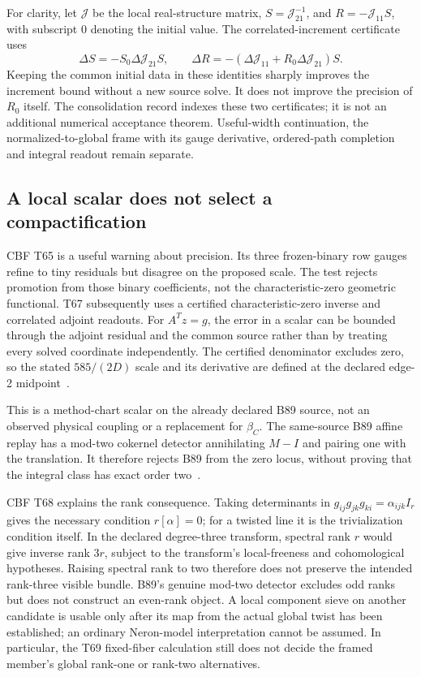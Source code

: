 \documentclass[11pt]{article}
\theoremstyle{definition}
\theoremstyle{remark}
\begin{document}
For clarity, let \(\mathcal J\) be the local real-structure matrix,
\(S=\mathcal J_{21}^{-1}\), and
\(R=-\mathcal J_{11}S\), with subscript 0 denoting the initial value.
The correlated-increment certificate uses
\[
 \Delta S=-S_0\Delta\mathcal J_{21}S,\qquad
 \Delta R=-(\Delta\mathcal J_{11}+R_0\Delta\mathcal J_{21})S.
\]
Keeping the common initial data in these identities sharply improves the
increment bound without a new source solve. It does not improve the
precision of \(R_0\) itself. The consolidation record indexes these two
certificates; it is not an additional numerical acceptance theorem.
Useful-width continuation, the normalized-to-global frame with its gauge
derivative, ordered-path completion and integral readout remain separate.

\subsection{A local scalar does not select a compactification}
\label{sec:readout-import}

CBF T65 is a useful warning about precision. Its three frozen-binary
row gauges refine to tiny residuals but disagree on the proposed scale.
The test rejects promotion from those binary coefficients, not the
characteristic-zero geometric functional. T67 subsequently uses a
certified characteristic-zero inverse and correlated adjoint readouts.
For \(A^Tz=g\), the error in a scalar can be bounded through the adjoint
residual and the common source rather than by treating every solved
coordinate independently. The certified denominator excludes zero, so
the stated \(585/(2D)\) scale and its derivative are defined at the
declared edge-2 midpoint~\cite{FluxReadout}.

This is a method-chart scalar on the already declared B89 source, not an
observed physical coupling or a replacement for \(\beta_C\). The
same-source B89 affine replay has a mod-two cokernel detector annihilating
\(M-I\) and pairing one with the translation. It therefore rejects
B89 from the zero locus, without proving that the integral class has
exact order two~\cite{FluxTwist}.

CBF T68 explains the rank consequence. Taking determinants in
\(g_{ij}g_{jk}g_{ki}=\alpha_{ijk}I_r\) gives the necessary condition
\(r[\alpha]=0\); for a twisted line it is the trivialization condition
itself. In the declared degree-three transform, spectral rank \(r\)
would give inverse rank \(3r\), subject to the transform's local-freeness
and cohomological hypotheses. Raising spectral rank to two therefore
does not preserve the intended rank-three visible bundle. B89's genuine
mod-two detector excludes odd ranks but does not construct an even-rank
object. A local component sieve on another candidate is usable only
after its map from the actual global twist has been established; an
ordinary Neron-model interpretation cannot be assumed. In particular,
the T69 fixed-fiber calculation still does not decide the framed member's
global rank-one or rank-two alternatives.
\end{document}

